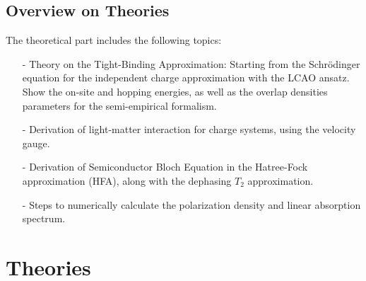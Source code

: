 \documentclass[12pt,english,a4paper]{article}
\begin{document}
	\subsection{Overview on Theories}
	\quad The theoretical part includes the following topics:
	\begin{itemize}
	\item[-] Theory on the Tight-Binding Approximation: Starting from the Schrödinger equation for the independent charge approximation with the LCAO ansatz. Show the on-site and hopping energies, as well as the overlap densities parameters for the semi-empirical formalism. 
	\item[-] Derivation of light-matter interaction for charge systems, using the velocity gauge. 
	\item[-] Derivation of Semiconductor Bloch Equation in the Hatree-Fock approximation (HFA), along with the dephasing $T_2$ approximation. 
	\item[-] Steps to numerically calculate the polarization density and linear absorption spectrum.
	\end{itemize}
	\newpage
	\section{Theories}
\end{document}
